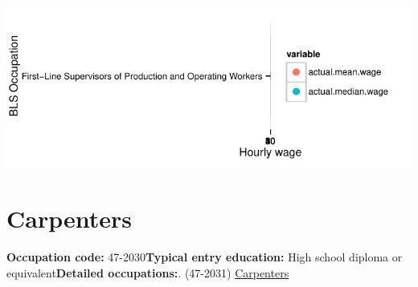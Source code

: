 \documentclass[a4paper,10pt]{article}\usepackage[]{graphicx}\usepackage[]{color}
\makeatletter
\def\maxwidth{ %
  \ifdim\Gin@nat@width>\linewidth
    \linewidth
  \else
    \Gin@nat@width
  \fi
}
\makeatother
\begin{document}
{\centering \includegraphics[width=\maxwidth]{figure/unnamed-chunk-255} 

}


\newpage\section{Carpenters}\textbf{Occupation code:} 47-2030\newline\textbf{Typical entry education:} High school diploma or equivalent\newline\textbf{Detailed occupations:}. (47-2031)  \href{http://www.bls.gov/oes/current/oes472031.htm}{Carpenters}\newline%
\end{document}
